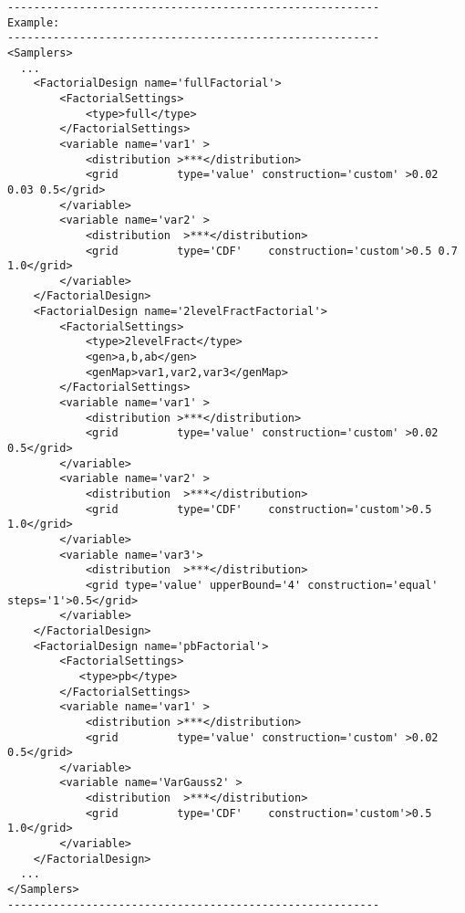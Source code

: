 \begin{lstlisting}[style=XML]
---------------------------------------------------------
Example:
---------------------------------------------------------
<Samplers>
  ...
    <FactorialDesign name='fullFactorial'>
        <FactorialSettings>
            <type>full</type>
        </FactorialSettings>
        <variable name='var1' >
            <distribution >***</distribution>
            <grid         type='value' construction='custom' >0.02 0.03 0.5</grid>
        </variable>
        <variable name='var2' >
            <distribution  >***</distribution>
            <grid         type='CDF'    construction='custom'>0.5 0.7 1.0</grid>
        </variable>
    </FactorialDesign>
    <FactorialDesign name='2levelFractFactorial'>
        <FactorialSettings>
            <type>2levelFract</type>
            <gen>a,b,ab</gen>
            <genMap>var1,var2,var3</genMap>
        </FactorialSettings>
        <variable name='var1' >
            <distribution >***</distribution>
            <grid         type='value' construction='custom' >0.02 0.5</grid>
        </variable>
        <variable name='var2' >
            <distribution  >***</distribution>
            <grid         type='CDF'    construction='custom'>0.5 1.0</grid>
        </variable>
        <variable name='var3'>
            <distribution  >***</distribution>
            <grid type='value' upperBound='4' construction='equal' steps='1'>0.5</grid>
        </variable>
    </FactorialDesign>
    <FactorialDesign name='pbFactorial'>
        <FactorialSettings>
           <type>pb</type>
        </FactorialSettings>
        <variable name='var1' >
            <distribution >***</distribution>
            <grid         type='value' construction='custom' >0.02 0.5</grid>
        </variable>
        <variable name='VarGauss2' >
            <distribution  >***</distribution>
            <grid         type='CDF'    construction='custom'>0.5 1.0</grid>
        </variable>
    </FactorialDesign>
  ...
</Samplers>
---------------------------------------------------------
\end{lstlisting}

